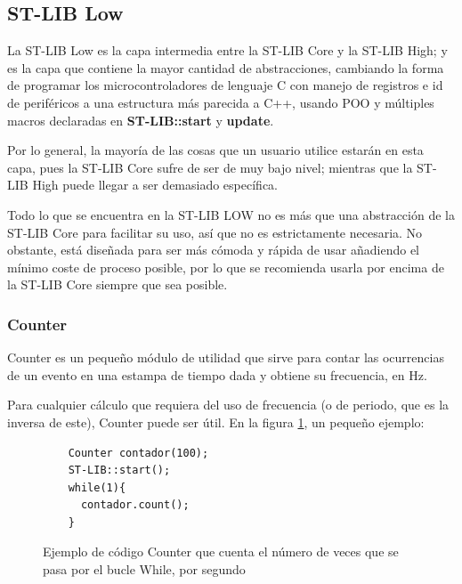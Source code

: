\documentclass{report}
\begin{document}
\newpage

\subsection{ST-LIB Low}
La ST-LIB Low es la capa intermedia entre la ST-LIB Core y la ST-LIB High; y es la capa que contiene la mayor cantidad de abstracciones, cambiando la forma de programar los microcontroladores de lenguaje C con manejo de registros e id de periféricos a una estructura más parecida a C++, usando POO y múltiples macros declaradas en \textbf{ST-LIB::start} y \textbf{update}. 
\par \vspace{0.3cm}
Por lo general, la mayoría de las cosas que un usuario utilice estarán en esta capa, pues la ST-LIB Core sufre de ser de muy bajo nivel; mientras que la ST-LIB High puede llegar a ser demasiado específica. 
\par \vspace{0.3cm}
Todo lo que se encuentra en la ST-LIB LOW no es más que una abstracción de la ST-LIB Core para facilitar su uso, así que no es estrictamente necesaria. No obstante, está diseñada para ser más cómoda y rápida de usar añadiendo el mínimo coste de proceso posible, por lo que se recomienda usarla por encima de la ST-LIB Core siempre que sea posible.

\subsubsection{Counter}
Counter es un pequeño módulo de utilidad que sirve para contar las ocurrencias de un evento en una estampa de tiempo dada y obtiene su frecuencia, en Hz. 
\par \vspace{0.3cm}
Para cualquier cálculo que requiera del uso de frecuencia (o de periodo, que es la inversa de este), Counter puede ser útil. En la figura \ref{CounterCode}, un pequeño ejemplo: 
\begin{figure}[H]
  \begin{lstlisting}
    Counter contador(100);
    ST-LIB::start();
    while(1){
      contador.count();
    }
  \end{lstlisting}
  \caption{Ejemplo de código Counter que cuenta el número de veces que se pasa por el bucle While, por segundo}
  \label{CounterCode}
\end{figure}
\par \vspace{0.3cm}
\end{document}
